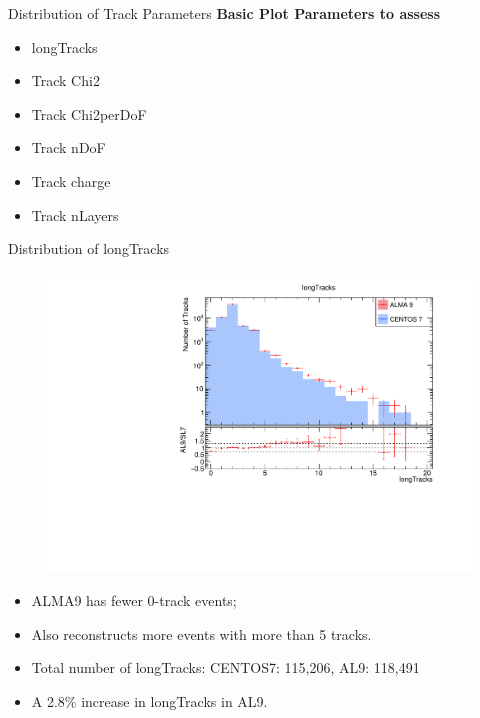 \begin{frame}{Distribution of Track Parameters}
    \textbf{Basic Plot Parameters to assess}
    \begin{itemize}
        \item longTracks
        \item Track Chi2
        \item Track Chi2perDoF
        \item Track nDoF
        \item Track charge
        \item Track nLayers
    \end{itemize}
\end{frame}

\begin{frame}{Distribution of longTracks}    
    \begin{figure}        
        \includegraphics[width=0.8\linewidth]{output/longTracks.pdf}
    \end{figure}
    \vspace{-0.5cm}
    \begin{itemize}
        \item \small ALMA9 has fewer 0-track events;
        \item \small Also reconstructs more events with more than 5 tracks.
        \item \small Total number of longTracks: CENTOS7: 115,206, AL9: 118,491
        \item \small A 2.8\% increase in longTracks in AL9.
    \end{itemize}
\end{frame}


